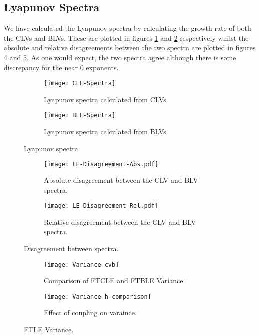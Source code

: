\subsection{Lyapunov Spectra}

We have calculated the Lyapunov spectra by calculating the growth rate of both the CLVs and BLVs. These are plotted in figures \ref{fig:CLE} and \ref{fig:BLE} respectively whilst the absolute and relative disagreements between the two spectra are plotted in figures \ref{fig:Abs-Disagree} and \ref{fig:Rel-Disagree}. As one would expect, the two spectra agree although there is some discrepancy for the near $0$ exponents.

\begin{figure}[ht]

\centering

\begin{subfigure}{0.4\linewidth}
	\centering
    \texttt{[image: CLE-Spectra]}
    \caption{Lyapunov spectra calculated from CLVs.}
    \label{fig:CLE}
\end{subfigure}
\hfill
\begin{subfigure}{0.4\linewidth}
	\centering
    \texttt{[image: BLE-Spectra]}
    \caption{Lyapunov spectra calculated from BLVs.}
    \label{fig:BLE}
\end{subfigure}

\caption{Lyapunov spectra.}
\label{fig:Spectra}
\end{figure}


\begin{figure}[ht]
    \centering

\begin{subfigure}{0.4\linewidth}
    \texttt{[image: LE-Disagreement-Abs.pdf]}
    \caption{Absolute disagreement between the CLV and BLV spectra.}
    \label{fig:Abs-Disagree}
\end{subfigure}
\hfill
\begin{subfigure}{0.4\linewidth}
    \texttt{[image: LE-Disagreement-Rel.pdf]}
    \caption{Relative disagreement between the CLV and BLV spectra.}
    \label{fig:Rel-Disagree}
\end{subfigure}

\caption{Disagreement between spectra.}
\label{fig:Errors}
\end{figure}


\begin{figure}[ht]
    \centering
\begin{subfigure}{0.4\linewidth}
	\centering
    \texttt{[image: Variance-cvb]}
    \caption{Comparison of FTCLE and FTBLE Variance.}
\end{subfigure}
\hfill
\begin{subfigure}{0.4\linewidth}
	\centering
    \texttt{[image: Variance-h-comparison]}
    \caption{Effect of coupling on varaince.}
\end{subfigure}

\caption{FTLE Variance.}
\end{figure}

